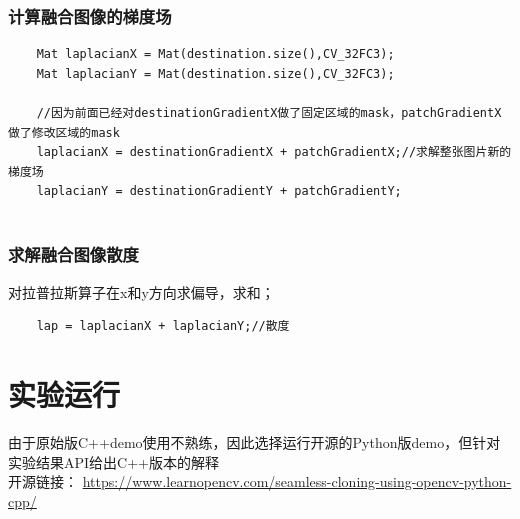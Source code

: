 \documentclass{article}
\begin{document}
    \subsubsection{计算融合图像的梯度场}
    \begin{lstlisting}
    Mat laplacianX = Mat(destination.size(),CV_32FC3);
    Mat laplacianY = Mat(destination.size(),CV_32FC3);
    
    //因为前面已经对destinationGradientX做了固定区域的mask，patchGradientX做了修改区域的mask
    laplacianX = destinationGradientX + patchGradientX;//求解整张图片新的梯度场
    laplacianY = destinationGradientY + patchGradientY;
    
    \end{lstlisting}
    
    \subsubsection{求解融合图像散度}
    对拉普拉斯算子在x和y方向求偏导，求和；
   \begin{lstlisting}
    lap = laplacianX + laplacianY;//散度
   \end{lstlisting}
    
    \section{实验运行}
    由于原始版C++demo使用不熟练，因此选择运行开源的Python版demo，但针对实验结果API给出C++版本的解释
    \\   开源链接：
    \href{https://www.learnopencv.com/seamless-cloning-using-opencv-python-cpp/}{	https://www.learnopencv.com/seamless-cloning-using-opencv-python-cpp/}
\end{document}
